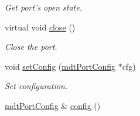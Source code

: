 \begin{DoxyCompactItemize}
\begin{DoxyCompactList}\small\item\em Get port's open state. \end{DoxyCompactList}\item 
virtual void \hyperlink{classmdt_abstract_port_a1ace1a2bd1a04f16952980e247b04800}{close} ()
\begin{DoxyCompactList}\small\item\em Close the port. \end{DoxyCompactList}\item 
\hypertarget{classmdt_abstract_port_a48bdc0a8057c3b119763643098cf798f}{
void \hyperlink{classmdt_abstract_port_a48bdc0a8057c3b119763643098cf798f}{setConfig} (\hyperlink{classmdt_port_config}{mdtPortConfig} $\ast$cfg)}
\label{classmdt_abstract_port_a48bdc0a8057c3b119763643098cf798f}

\begin{DoxyCompactList}\small\item\em Set configuration. \end{DoxyCompactList}\item 
\hypertarget{classmdt_abstract_port_a3d105c90696f7c40f29c24fe9b6e4481}{
\hyperlink{classmdt_port_config}{mdtPortConfig} \& \hyperlink{classmdt_abstract_port_a3d105c90696f7c40f29c24fe9b6e4481}{config} ()}
\label{classmdt_abstract_port_a3d105c90696f7c40f29c24fe9b6e4481}


\end{DoxyCompactItemize}
